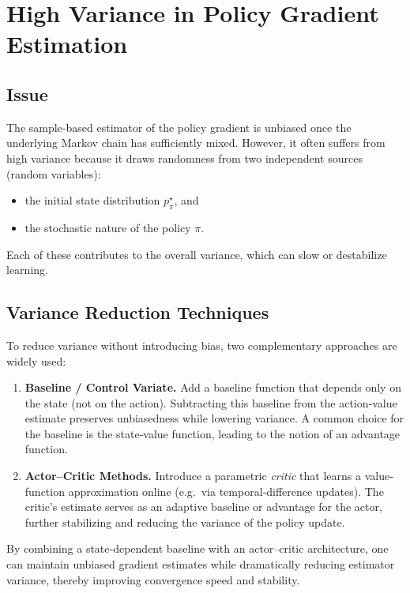 \section{High Variance in Policy Gradient Estimation}

\subsection{Issue}
The sample‐based estimator of the policy gradient is unbiased once the underlying Markov chain has sufficiently mixed. However, it often suffers from high variance because it draws randomness from two independent sources (random variables):
\begin{itemize}
  \item the initial state distribution $p_\pi^\star$, and
  \item the stochastic nature of the policy $\pi$.
\end{itemize}
Each of these contributes to the overall variance, which can slow or destabilize learning.

\subsection{Variance Reduction Techniques}
To reduce variance without introducing bias, two complementary approaches are widely used:

\begin{enumerate}
  \item \textbf{Baseline / Control Variate.}  
    Add a baseline function that depends only on the state (not on the action).  
    Subtracting this baseline from the action‐value estimate preserves unbiasedness while lowering variance.  
    A common choice for the baseline is the state‐value function, leading to the notion of an advantage function.

  \item \textbf{Actor–Critic Methods.}  
    Introduce a parametric \emph{critic} that learns a value‐function approximation online (e.g.\ via temporal‐difference updates).  
    The critic’s estimate serves as an adaptive baseline or advantage for the actor, further stabilizing and reducing the variance of the policy update.
\end{enumerate}

By combining a state‐dependent baseline with an actor–critic architecture, one can maintain unbiased gradient estimates while dramatically reducing estimator variance, thereby improving convergence speed and stability.
